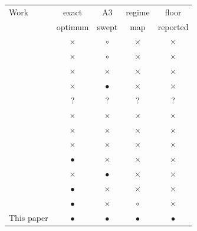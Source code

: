\footnotesize
\begin{tabular}{@{}p{32mm}cccc@{}}
\toprule
Work & exact & A3 & regime & floor \\
 & optimum & swept & map & reported \\
\midrule
\citet{demir2022} & $\times$ & $\circ$ & $\times$ & $\times$ \\
\citet{kodheli2024} & $\times$ & $\circ$ & $\times$ & $\times$ \\
\citet{juan2022} & $\times$ & $\times$ & $\times$ & $\times$ \\
\citet{benzaghta2025} & $\times$ & $\bullet$ & $\times$ & $\times$ \\
\citet{zhao2026twc} & ? & ? & ? & ? \\
\citet{chou2026ddqn} & $\times$ & $\times$ & $\times$ & $\times$ \\
\citet{lee2023dho} & $\times$ & $\times$ & $\times$ & $\times$ \\
\citet{hozayen2022} & $\times$ & $\times$ & $\times$ & $\times$ \\
\citet{mcbain2026ergodic} & $\bullet$ & $\times$ & $\times$ & $\times$ \\
\citet{eydian2025bipartite} & $\times$ & $\bullet$ & $\times$ & $\times$ \\
\citet{hossain2026satlock} & $\bullet$ & $\times$ & $\times$ & $\times$ \\
\citet{namyar2022} & $\bullet$ & $\times$ & $\circ$ & $\times$ \\
\midrule
This paper & $\bullet$ & $\bullet$ & $\bullet$ & $\bullet$ \\
\bottomrule
\end{tabular}
